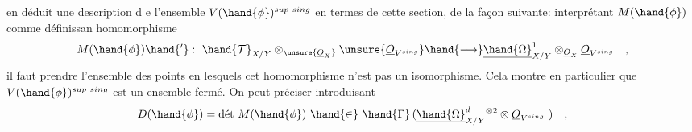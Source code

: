 en déduit une description d e l'ensemble $V(\hand{\phi})^{sup\ sing}$ en termes de
cette section, de la façon suivante: interprétant $M(\hand{\phi})$ comme définissan
homomorphisme
\[
M(\hand{\phi})\hand{'} : \ \hand{\mathcal{T}}_{X/Y} \otimes_{\unsure{\underline{O}_X}} \unsure{\underline{O}_{V^{sing}}} \hand{\longrightarrow} \underline{\hand{\Omega}}^1_{X/Y} \otimes_{\underline{O}_X} \underline{O}_{V^{sing}} \quad ,
\]
il faut prendre l'ensemble des points en lesquels cet homomorphisme
n'est pas un isomorphisme. Cela montre en particulier que $V(\hand{\phi})^{sup\ sing}$
est un ensemble fermé. On peut  préciser  introduisant
\[
D(\hand{\phi}) = \text{dét}\ M(\hand{\phi}) \ \hand{\in} \ \hand{\Gamma}\,(\underline{\hand{\Omega}}^d_{X/Y}{}^{\otimes 2} \otimes \underline{O}_{V^{sing}}\ ) \quad ,
\]

